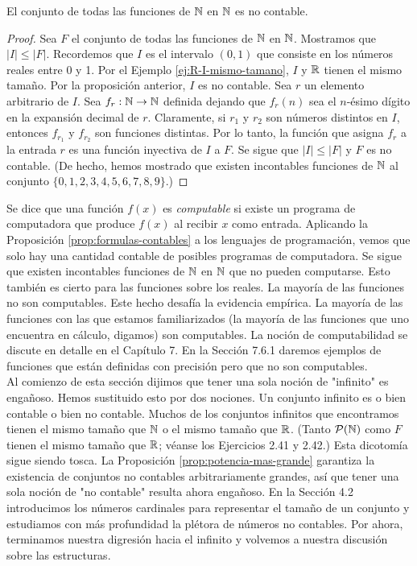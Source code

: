 \message{ !name(main.tex)}\documentclass[12pt,a4paper]{book}
\newcommand{\comillas}[1]{"#1"}
\begin{document}
    \begin{proposicion}\label{prop:funciones-no-contables}
        El conjunto de todas las funciones de $\mathbb{N}$ en $\mathbb{N}$ es no contable.
    \end{proposicion}
    \begin{proof}
        Sea $F$ el conjunto de todas las funciones de $\mathbb{N}$ en $\mathbb{N}$. Mostramos que $|I|\leq|F|$. Recordemos que $I$ es el
        intervalo $(0,1)$ que consiste en los números reales entre 0 y 1. Por el Ejemplo \ref{ej:R-I-mismo-tamano}, $I$ y
        $\mathbb{R}$ tienen el mismo tamaño. Por la proposición anterior, $I$ es no contable. Sea $r$ un elemento arbitrario de $I$.
        Sea $f_{r}:\mathbb{N}\rightarrow\mathbb{N}$ definida dejando que $f_{r}(n)$ sea el $n$-ésimo dígito en la expansión decimal de $r$.
        Claramente, si $r_{1}$ y $r_{2}$ son números distintos en $I$, entonces $f_{r_{1}}$ y $f_{r_{2}}$ son funciones
        distintas. Por lo tanto, la función que asigna $f_{r}$ a la entrada $r$ es una función inyectiva de $I$ a $F$. Se
        sigue que $|I|\leq|F|$ y $F$ es no contable. (De hecho, hemos mostrado que existen incontables funciones de
        $\mathbb{N}$ al conjunto $\{0,1,2,3,4,5,6,7,8,9\}$.)
    \end{proof}

    Se dice que una función $f(x)$ es \textit{computable} si existe un programa de computadora que produce $f(x)$ al
    recibir $x$ como entrada. Aplicando la Proposición \ref{prop:formulas-contables} a los lenguajes de programación, vemos
    que solo hay una cantidad contable de posibles programas de computadora. Se sigue que existen incontables funciones de
    $\mathbb{N}$ en $\mathbb{N}$ que no pueden computarse. Esto también es cierto para las funciones sobre los reales. La mayoría de las
    funciones no son computables. Este hecho desafía la evidencia empírica. La mayoría de las funciones con las que estamos
    familiarizados (la mayoría de las funciones que uno encuentra en cálculo, digamos) son computables. La noción de
    computabilidad se discute en detalle en el Capítulo 7. En la Sección 7.6.1 daremos ejemplos de funciones que están
    definidas con precisión pero que no son computables.\\
    Al comienzo de esta sección dijimos que tener una sola noción de \comillas{infinito} es engañoso. Hemos sustituido
    esto por dos nociones. Un conjunto infinito es o bien contable o bien no contable. Muchos de los conjuntos infinitos que
    encontramos tienen el mismo tamaño que $\mathbb{N}$ o el mismo tamaño que $\mathbb{R}$. (Tanto $\mathcal{P}(\mathbb{N})$ como $F$ tienen el mismo
    tamaño que $\mathbb{R}$; véanse los Ejercicios 2.41 y 2.42.) Esta dicotomía sigue siendo tosca. La Proposición
    \ref{prop:potencia-mas-grande} garantiza la existencia de conjuntos no contables arbitrariamente grandes, así que
    tener una sola noción de \comillas{no contable} resulta ahora engañoso. En la Sección 4.2 introducimos los números
    cardinales para representar el tamaño de un conjunto y estudiamos con más profundidad la plétora de números no
    contables. Por ahora, terminamos nuestra digresión hacia el infinito y volvemos a nuestra discusión sobre las
    estructuras.
\end{document}
